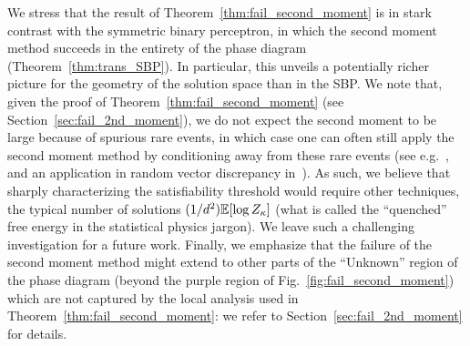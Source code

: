 \myskip
We stress that the result of Theorem~\ref{thm:fail_second_moment} is in stark contrast with the symmetric binary perceptron, in 
which the second moment method succeeds in the entirety of the phase diagram (Theorem~\ref{thm:trans_SBP}).
In particular, this unveils a potentially richer picture for the geometry of the solution space than in the SBP.
We note that, given the proof of Theorem~\ref{thm:fail_second_moment} (see Section~\ref{sec:fail_2nd_moment}), 
we do not expect the second moment to be large because of spurious rare events, in which case one can often
still apply the second moment method by conditioning away from these rare events (see e.g.~\cite{janson1996second}, and an application in random vector discrepancy in~\cite{altschuler2022discrepancy}). 
As such, we believe that sharply characterizing the satisfiability threshold would require other techniques,  the typical number of solutions 
$(1/d^2) \mathbb{E}[\log Z_\kappa]$ (what is called the ``quenched'' free energy in the statistical physics jargon).
We leave such a challenging investigation for a future work.
Finally, we emphasize that the failure of the second moment method might extend to other parts of the ``Unknown'' region of the phase diagram
(beyond the purple region of Fig.~\ref{fig:fail_second_moment}) 
which are not captured by the local analysis used in Theorem~\ref{thm:fail_second_moment}: we refer to Section~\ref{sec:fail_2nd_moment} for details.

